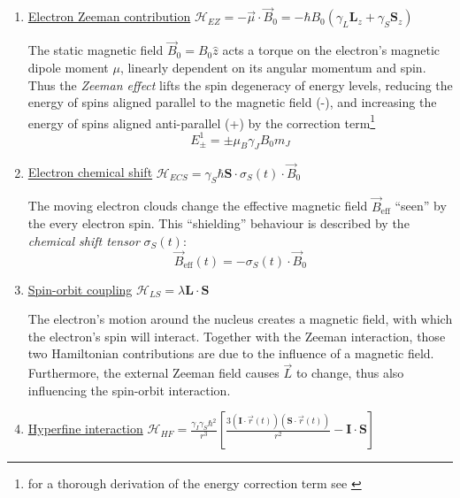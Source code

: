 \documentclass[11.5pt,a4paper]{article}
\begin{document}
\begin{enumerate}
  \item \uline{Electron Zeeman contribution} $\mathcal{H}_{EZ} = - \vec{\mu} \cdot \vec{B}_0 = -\hbar B_0 (\gamma_L \mathbf{L}_z + \gamma_S \mathbf{S}_z)$

  The static magnetic field $\vec{B}_0 = B_0 \hat{z}$ acts a torque on the electron's magnetic dipole moment $\mu$, linearly dependent on its angular momentum and spin. Thus the \emph{Zeeman effect} lifts the spin degeneracy of energy levels, reducing the energy of spins aligned parallel to the magnetic field (-), and increasing the energy of spins aligned anti-parallel (+) by the correction term\footnote{for a thorough derivation of the energy correction term see \cite[chap. 6.4 The Zeeman Effect, p. 277ff]{griffiths}}
  \begin{equation}
   E^1_\pm = \pm \mu_B \gamma_J B_0 m_J 
  \end{equation}
  

  \item \uline{Electron chemical shift} $\mathcal{H}_{ECS} = \gamma_S \hbar \mathbf{S} \cdot \sigma_S(t) \cdot \vec{B}_0$
  
  The moving electron clouds change the effective magnetic field $\vec{B}_\text{eff}$ ``seen'' by the every electron spin. This ``shielding'' behaviour is described by the \emph{chemical shift tensor} $\sigma_S(t)$:
  \begin{equation}
    \vec{B}_\text{eff}(t) = - \sigma_S(t) \cdot \vec{B}_0
  \end{equation}

  \item \uline{Spin-orbit coupling} $\mathcal{H}_{LS} = \lambda \mathbf{L}\cdot \mathbf{S}$

  The electron's motion around the nucleus creates a magnetic field, with which the electron's spin will interact. 
  Together with the Zeeman interaction, those two Hamiltonian contributions are due to the influence of a magnetic field. Furthermore, the external Zeeman field causes $\vec{L}$ to change, thus also influencing the spin-orbit interaction.

  \item \uline{Hyperfine interaction} $\mathcal{H}_{HF} = \frac{\gamma_I \gamma_S \hbar^2}{r^3} \left[ \frac{3 (\mathbf{I} \cdot \vec{r}(t) ) (\mathbf{S} \cdot \vec{r}(t) )}{r^2} - \mathbf{I} \cdot \mathbf{S} \right]$
   

\end{enumerate}
\end{document}

